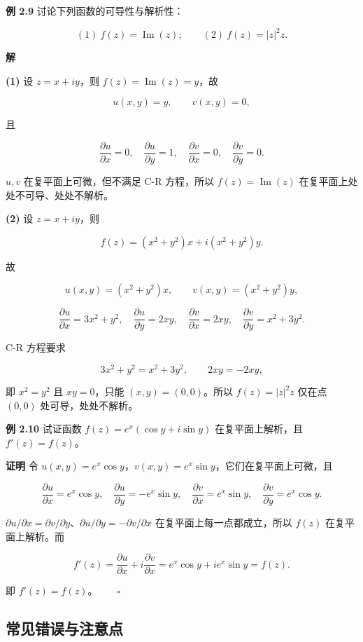 \textbf{例 2.9} 讨论下列函数的可导性与解析性：

\[
(1)\ f(z)=\operatorname{Im}(z);\qquad (2)\ f(z)=|z|^2z .
\]

\textbf{解}

\textbf{(1)} 设 \(z=x+iy\)，则 \(f(z)=\operatorname{Im}(z)=y\)，故

\[
u(x,y)=y,\qquad v(x,y)=0,
\]

且

\[
\frac{\partial u}{\partial x}=0,\quad
\frac{\partial u}{\partial y}=1,\quad
\frac{\partial v}{\partial x}=0,\quad
\frac{\partial v}{\partial y}=0 .
\]

\(u,v\) 在复平面上可微，但不满足 C-R 方程，所以
\(f(z)=\operatorname{Im}(z)\) 在复平面上处处不可导、处处不解析。

\textbf{(2)} 设 \(z=x+iy\)，则

\[
f(z)=(x^2+y^2)x+i(x^2+y^2)y .
\]

故

\[
u(x,y)=(x^2+y^2)x,\qquad v(x,y)=(x^2+y^2)y,
\]

\[
\frac{\partial u}{\partial x}=3x^2+y^2,\quad
\frac{\partial u}{\partial y}=2xy,\quad
\frac{\partial v}{\partial x}=2xy,\quad
\frac{\partial v}{\partial y}=x^2+3y^2 .
\]

C-R 方程要求

\[
3x^2+y^2=x^2+3y^2,\qquad 2xy=-2xy,
\]

即 \(x^2=y^2\) 且 \(xy=0\)，只能 \((x,y)=(0,0)\)。所以 \(f(z)=|z|^2z\)
仅在点 \((0,0)\) 处可导，处处不解析。

\textbf{例 2.10} 试证函数 \(f(z)=e^x(\cos y+i\sin y)\)
在复平面上解析，且 \(f'(z)=f(z)\)。

\textbf{证明} 令
\(u(x,y)=e^x\cos y\)，\(v(x,y)=e^x\sin y\)，它们在复平面上可微，且

\[
\frac{\partial u}{\partial x}=e^x\cos y,\quad
\frac{\partial u}{\partial y}=-e^x\sin y,\quad
\frac{\partial v}{\partial x}=e^x\sin y,\quad
\frac{\partial v}{\partial y}=e^x\cos y .
\]

\(\partial u/\partial x=\partial v/\partial y\)、\(\partial u/\partial y=-\partial v/\partial x\)
在复平面上每一点都成立，所以 \(f(z)\) 在复平面上解析。而

\[
f'(z)=\frac{\partial u}{\partial x}+i\frac{\partial v}{\partial x}
=e^x\cos y+ie^x\sin y=f(z).
\]

即 \(f'(z)=f(z)\)。\(\qquad\square\)

\subsection{常见错误与注意点}\label{ux5e38ux89c1ux9519ux8befux4e0eux6ce8ux610fux70b9-5}

